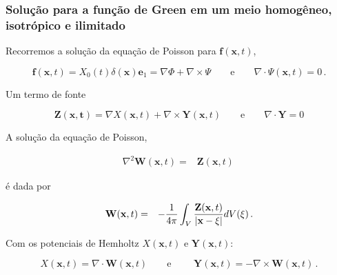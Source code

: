 \documentclass[xcolor=table]{beamer}
\newcommand{\xvec}{\mathbf{x}}
\newcommand{\evec}{\mathbf{e}}
\newcommand{\fvec}{\mathbf{f}}
\newcommand{\xivec}{\boldmath \xi}
\begin{document}
\begin{frame}
\frametitle{\textbf{Solu\c{c}\~ao para a fun\c{c}\~ao de Green em um meio homog\^eneo, isotr\'opico e ilimitado}}

\begin{flushleft}
Recorremos a solu\c{c}\~ao da equa\c{c}\~ao de Poisson para $\fvec(\xvec,t)$,
\end{flushleft}   
\begin{equation*}
  \label{ten1}
      \fvec(\xvec,t) = X_{0}(t)\delta(\xvec)\evec_1 = \nabla \Phi + \nabla \times \Psi \quad\quad \mbox{e} \quad\quad    \nabla \cdot \Psi(\xvec,t) = 0 \, .
\end{equation*}
\begin{flushleft}
Um termo de fonte
\end{flushleft}
\begin{equation*}     
 \mathbf{Z(\xvec,t)} = \nabla X(\xvec,t) + \nabla \times \mathbf{Y}(\xvec,t) \qquad \mbox{e} \qquad
 \nabla \cdot \mathbf{Y} = 0
\end{equation*}
\begin{flushleft}
A solu\c{c}\~ao da equa\c{c}\~ao de Poisson,
\end{flushleft}       
\begin{align*}     
 \nabla^2 \mathbf{W}(\xvec,t) =&  \mathbf{Z}(\xvec,t)\, 
\end{align*}  
\begin{flushleft}  
\'e dada por
\end{flushleft}
\begin{eqnarray}
  \label{ten1}
     \mathbf{W}(\xvec,t) &=& - \frac{1}{4\pi} \int_{V} \frac{\mathbf{Z}(\xvec,t)}{\left| \xvec - \xivec \right|} dV(\xivec)\, .
 \end{eqnarray}
\begin{flushleft}
Com os potenciais de Hemholtz $X(\xvec,t)$ e $\mathbf{Y}(\xvec,t)$:
\end{flushleft}
\begin{equation*}          
    X(\xvec,t) = \nabla \cdot \mathbf{W}(\xvec,t) \qquad \mbox{e } \qquad
   \mathbf{Y}(\xvec,t) =- \nabla \times \mathbf{W}(\xvec,t)\, .
\end{equation*}         
 
\end{frame}%
\end{document}
